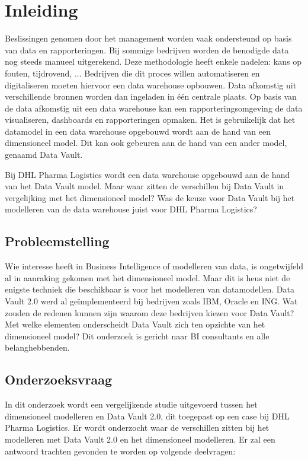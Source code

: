
\chapter{Inleiding}
\label{ch:inleiding}
Beslissingen genomen door het management worden vaak ondersteund op basis van data en rapporteringen. Bij sommige bedrijven worden de benodigde data nog steeds manueel uitgerekend. Deze methodologie heeft enkele nadelen: kans op fouten, tijdrovend, ... Bedrijven die dit proces willen automatiseren en digitaliseren moeten hiervoor een data warehouse opbouwen. Data afkomstig uit verschillende bronnen worden dan ingeladen in één centrale plaats. Op basis van de data afkomstig uit een data warehouse kan een rapporteringsomgeving de data visualiseren, dashboards en rapporteringen opmaken. Het is gebruikelijk dat het datamodel in een data warehouse opgebouwd wordt aan de hand van een dimensioneel model. Dit kan ook gebeuren aan de hand van een ander model, genaamd Data Vault. 

Bij DHL Pharma Logistics wordt een data warehouse opgebouwd aan de hand van het Data Vault model. Maar waar zitten de verschillen bij Data Vault in vergelijking met het dimensioneel model? Was de keuze voor Data Vault bij het modelleren van de data warehouse juist voor DHL Pharma Logistics?



\section{Probleemstelling}
\label{sec:probleemstelling}

Wie interesse heeft in Business Intelligence of modelleren van data, is ongetwijfeld al in aanraking gekomen met het dimensioneel model. Maar dit is heus niet de enigste techniek die beschikbaar is voor het modelleren van datamodellen. Data Vault 2.0 werd al geïmplementeerd bij bedrijven zoals IBM, Oracle en ING. Wat zouden de redenen kunnen zijn waarom deze bedrijven kiezen voor Data Vault? Met welke elementen onderscheidt Data Vault zich ten opzichte van het dimensioneel model? Dit onderzoek is gericht naar BI consultants en alle belanghebbenden.

\section{Onderzoeksvraag}
\label{sec:onderzoeksvraag}
In dit onderzoek wordt een vergelijkende studie uitgevoerd tussen het dimensioneel modelleren en Data Vault 2.0, dit toegepast op een case bij DHL Pharma Logistics. Er wordt onderzocht waar de verschillen zitten bij het modelleren met Data Vault 2.0 en het dimensioneel modelleren. Er zal een antwoord trachten gevonden te worden op volgende deelvragen:


